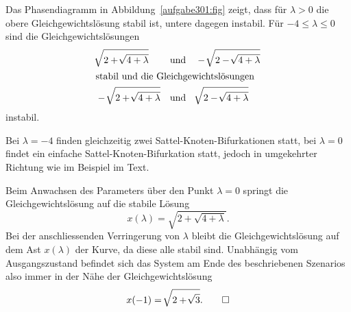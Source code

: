 \begin{loesung}
\begin{teilaufgaben}
Das Phasendiagramm in Abbildung~\ref{aufgabe301:fig} zeigt,
dass für $\lambda >0$ die obere Gleichgewichtslösung stabil ist,
untere dagegen instabil.
Für $-4\le\lambda\le 0$ sind die Gleichgewichtslösungen
\begin{align*}
&\!\sqrt{2+\!\sqrt{4+\lambda}}
&&\text{und}&
&-\!\sqrt{2-\!\sqrt{4+\lambda}}
\\
\intertext{stabil und die Gleichgewichtslösungen}
&-\!\sqrt{2+\!\sqrt{4+\lambda}}
&&\text{und}&
&\!\sqrt{2-\!\sqrt{4+\lambda}}
\end{align*}
instabil.

Bei $\lambda=-4$ finden gleichzeitig zwei Sattel-Knoten-Bifurkationen 
statt, bei $\lambda=0$ findet ein einfache Sattel-Knoten-Bifurkation
statt, jedoch in umgekehrter Richtung wie im Beispiel im Text.
\item
Beim Anwachsen des Parameters über den Punkt $\lambda=0$ springt die
Gleichgewichtslösung auf die stabile Lösung
\[
x(\lambda)=\!\sqrt{2+\!\sqrt{4+\lambda}}.
\]
Bei der anschliessenden Verringerung von $\lambda$ bleibt die 
Gleichgewichtslösung auf dem Ast $x(\lambda)$ der Kurve, da diese
alle stabil sind.
Unabhängig vom Ausgangszustand befindet sich das System am Ende des
beschriebenen Szenarios also immer in der Nähe der Gleichgewichtslösung
\[
x(-1)=\!\sqrt{2+\!\sqrt{3}}.
\qedhere
\]
\end{teilaufgaben}
\end{loesung}

